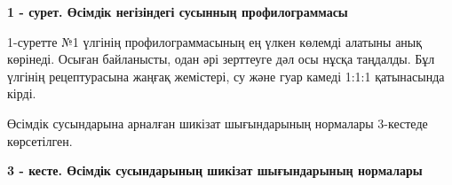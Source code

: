 {%
% 
% 
% 

{\bfseries 1 - сурет. Өсімдік негізіндегі сусынның профилограммасы}

1-суретте №1 үлгінің профилограммасының ең үлкен көлемді алатыны анық
көрінеді. Осыған байланысты, одан әрі зерттеуге дәл осы нұсқа таңдалды.
Бұл үлгінің рецептурасына жаңғақ жемістері, су және гуар камеді 1:1:1
қатынасында кірді.

Өсімдік сусындарына арналған шикізат шығындарының нормалары 3-кестеде
көрсетілген.

{\bfseries 3 - кесте. Өсімдік сусындарының шикізат шығындарының нормалары}

}

